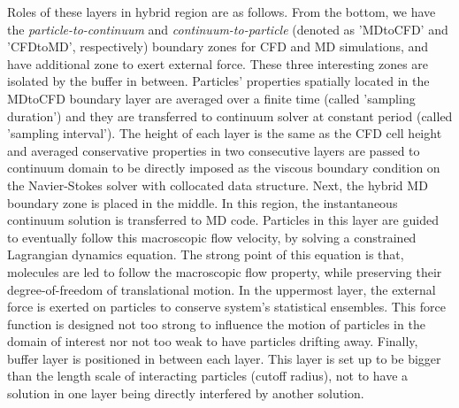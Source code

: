 \documentclass[preprint,12pt]{elsarticle}
\begin{document}
Roles of these layers in hybrid region are as follows.
From the bottom, we have the {\it{particle-to-continuum}} and {\it{continuum-to-particle}} (denoted as 'MDtoCFD' and 'CFDtoMD', respectively) boundary zones for CFD and MD simulations, and have additional zone to exert external force. These three interesting zones are isolated by the buffer in between.
Particles' properties spatially located in the MDtoCFD boundary layer are averaged over a finite time (called 'sampling duration') and they are transferred to continuum solver at constant period (called 'sampling interval'). The height of each layer is the same as the CFD cell height and averaged conservative properties in two consecutive layers are passed to continuum domain to be directly imposed as the viscous boundary condition on the Navier-Stokes solver with collocated data structure.
Next, the hybrid MD boundary zone is placed in the middle. In this region, the instantaneous continuum solution is transferred to MD code. Particles in this layer are guided to eventually follow this macroscopic flow velocity, by solving a constrained Lagrangian dynamics equation. The strong point of this equation is that, molecules are led to follow the macroscopic flow property, while preserving their degree-of-freedom of translational motion.
In the uppermost layer, the external force is exerted on particles to conserve system's statistical ensembles. This force function is designed not too strong to influence the motion of particles in the domain of interest nor not too weak to have particles drifting away. %
Finally, buffer layer is positioned in between each layer. This layer is set up to be bigger than the length scale of interacting particles (cutoff radius), not to have a solution in one layer being directly interfered by another solution.
\end{document}
